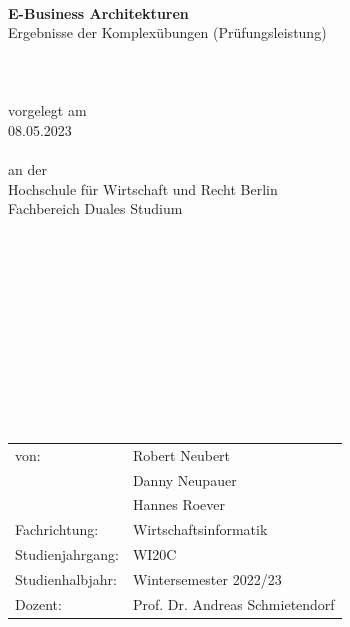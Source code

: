 \documentclass[notitlepage, hidelinks]{article}
\begin{document}
\mbox{}\\ \mbox{}\\\mbox{}\\ \mbox{}\\\mbox{}\\ \mbox{}\\\mbox{}\\\mbox{}\\
\mbox{}\\\mbox{}\\\mbox{}\\\mbox{}\\\mbox{}\\\mbox{}\\\mbox{}\\\mbox{}\\
\begin{center}
\huge
\textbf{E-Business Architekturen} \\ 
\LARGE
Ergebnisse der Komplexübungen (Prüfungsleistung) \\
\mbox{}\\


\mbox{}\\ \mbox{}\\
\large
vorgelegt am \\
08.05.2023 \\
\mbox{}\\
an der \\
Hochschule für Wirtschaft und Recht Berlin \\
Fachbereich Duales Studium \\
\end{center}

\mbox{}\\ \mbox{}\\\mbox{}\\ \mbox{}\\\mbox{}\\ \mbox{}\\\mbox{}\\ \mbox{}\\\mbox{}\\ \mbox{}\\
\begin{table}[H]
\begin{tabular}{ l l }
von: 
& Robert Neubert \\
& Danny Neupauer \\
& Hannes Roever \\
Fachrichtung: & Wirtschaftsinformatik \\
Studienjahrgang: & WI20C \\
Studienhalbjahr:& Wintersemester 2022/23 \\
Dozent: & Prof. Dr. Andreas Schmietendorf \\
\end{tabular}
\end{table}
\end{document}
